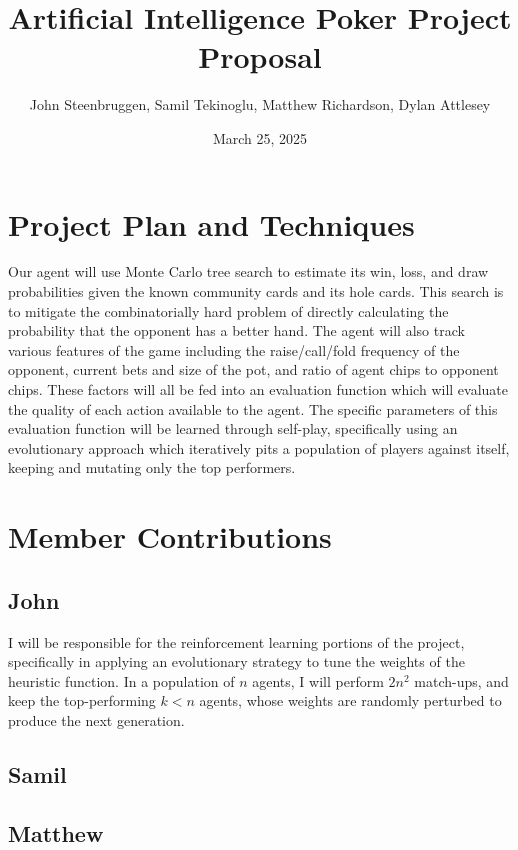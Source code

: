 \documentclass{article}
\title{Artificial Intelligence Poker Project Proposal}
\author{John Steenbruggen, Samil Tekinoglu, Matthew Richardson, Dylan Attlesey}
\date{March 25, 2025}
\begin{document}
\maketitle
\section{Project Plan and Techniques}
Our agent will use Monte Carlo tree search to estimate its win, loss, and draw probabilities given the known community cards and its hole cards. This search is to mitigate the combinatorially hard problem of directly calculating the probability that the opponent has a better hand. The agent will also track various features of the game including the raise/call/fold frequency of the opponent, current bets and size of the pot, and ratio of agent chips to opponent chips. These factors will all be fed into an evaluation function which will evaluate the quality of each action available to the agent. The specific parameters of this evaluation function will be learned through self-play, specifically using an evolutionary approach which iteratively pits a population of players against itself, keeping and mutating only the top performers.
\section{Member Contributions}
\subsection{John}
I will be responsible for the reinforcement learning portions of the project, specifically in applying an evolutionary strategy to tune the weights of the heuristic function. In a population of $n$ agents, I will perform $2n^2$ match-ups, and keep the top-performing $k<n$ agents, whose weights are randomly perturbed to produce the next generation.
\subsection{Samil}
\subsection{Matthew}
\end{document}
